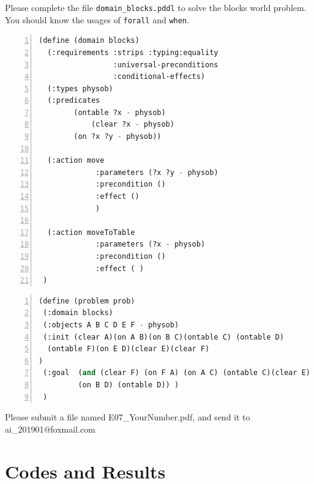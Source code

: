 ﻿\documentclass[a4paper, 11pt]{article}
\begin{document}
Please complete the file \texttt{domain\_blocks.pddl} to solve the blocks world problem. You should know the usages of \texttt{forall} and \texttt{when}.

\begin{lstlisting}[title=domain\_blocks.pddl,frame=single,language=lisp,numbers=left]
(define (domain blocks)
  (:requirements :strips :typing:equality
                 :universal-preconditions
                 :conditional-effects)
  (:types physob)
  (:predicates
  	    (ontable ?x - physob)
            (clear ?x - physob)
	    (on ?x ?y - physob))

  (:action move
             :parameters (?x ?y - physob)
             :precondition ()
             :effect ()
             )

  (:action moveToTable
             :parameters (?x - physob)
             :precondition ()
             :effect ( )
 )
\end{lstlisting}

\begin{lstlisting}[title=blocks.pddl,frame=single,language=lisp,numbers=left]
(define (problem prob)
 (:domain blocks)
 (:objects A B C D E F - physob)
 (:init (clear A)(on A B)(on B C)(ontable C) (ontable D)
  (ontable F)(on E D)(clear E)(clear F)
)
 (:goal  (and (clear F) (on F A) (on A C) (ontable C)(clear E) (on E B)
         (on B D) (ontable D)) )
 )
\end{lstlisting}
Please submit a file named \textsf{E07\_YourNumber.pdf}, and send it to \textsf{ai\_201901@foxmail.com}


\section{Codes and Results}
\end{document}
